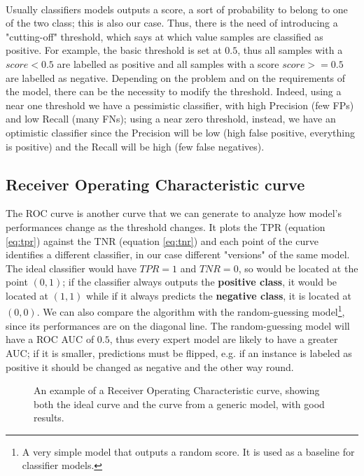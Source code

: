 \paragraph{}
Usually classifiers models outputs a score, a sort of probability to belong to one of the two class; this is also our case. Thus, there is the need of introducing a "cutting-off" threshold, which says at which value samples are classified as positive. For example, the basic threshold is set at $0.5$, thus all samples with a $score < 0.5$ are labelled as positive and all samples with a score $score >= 0.5$ are labelled as negative. \newline
Depending on the problem and on the requirements of the model, there can be the necessity to modify the threshold. Indeed, using a near one threshold we have a pessimistic classifier, with high Precision (few FPs) and low Recall (many FNs); using a near zero threshold, instead, we have an optimistic classifier since the Precision will be low (high false positive, everything is positive) and the Recall will be high (few false negatives).

\subsection{Receiver Operating Characteristic curve}
The ROC curve is another curve that we can generate to analyze how model's performances change as the threshold changes. It plots the TPR (equation \ref{eq:tpr}) against the TNR (equation \ref{eq:tnr}) and each point of the curve identifies a different classifier, in our case different "versions" of the same model. \newline
The ideal classifier would have $TPR = 1$ and $TNR = 0$, so would be located at the point $(0, 1)$; if the classifier always outputs the \textbf{positive class}, it would be located at $(1, 1)$ while if it always predicts the \textbf{negative class}, it is located at $(0, 0)$. We can also compare the algorithm with the random-guessing model\footnote{A very simple model that outputs a random score. It is used as a baseline for classifier models.}, since its performances are on the diagonal line. \newline
The random-guessing model will have a ROC AUC of $0.5$, thus every expert model are likely to have a greater AUC; if it is smaller, predictions must be flipped, e.g. if an instance is labeled as positive it should be changed as negative and the other way round.

\begin{figure}[hb]
    \centering
    
    \caption{An example of a Receiver Operating Characteristic curve, showing both the ideal curve and the curve from a generic model, with good results.}
\end{figure}